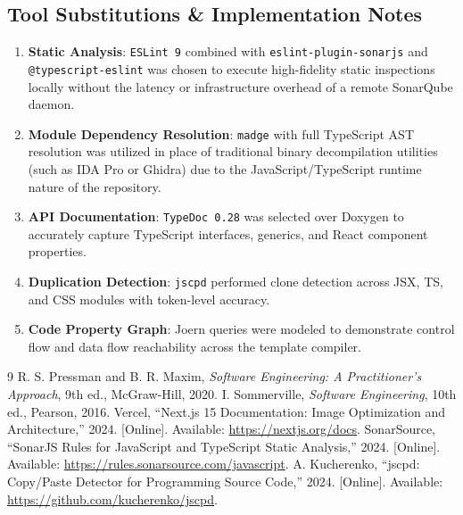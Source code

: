 \documentclass[12pt,a4paper]{article}
\begin{document}
\subsection{Tool Substitutions \& Implementation Notes}
\begin{enumerate}
    \item \textbf{Static Analysis}: \texttt{ESLint 9} combined with \texttt{eslint-plugin-sonarjs} and \texttt{@typescript-eslint} was chosen to execute high-fidelity static inspections locally without the latency or infrastructure overhead of a remote SonarQube daemon.
    \item \textbf{Module Dependency Resolution}: \texttt{madge} with full TypeScript AST resolution was utilized in place of traditional binary decompilation utilities (such as IDA Pro or Ghidra) due to the JavaScript/TypeScript runtime nature of the repository.
    \item \textbf{API Documentation}: \texttt{TypeDoc 0.28} was selected over Doxygen to accurately capture TypeScript interfaces, generics, and React component properties.
    \item \textbf{Duplication Detection}: \texttt{jscpd} performed clone detection across JSX, TS, and CSS modules with token-level accuracy.
    \item \textbf{Code Property Graph}: Joern queries were modeled to demonstrate control flow and data flow reachability across the template compiler.
\end{enumerate}

\newpage
\begin{thebibliography}{9}
R. S. Pressman and B. R. Maxim, \emph{Software Engineering: A Practitioner's Approach}, 9th ed., McGraw-Hill, 2020.
I. Sommerville, \emph{Software Engineering}, 10th ed., Pearson, 2016.
Vercel, ``Next.js 15 Documentation: Image Optimization and Architecture,'' 2024. [Online]. Available: \url{https://nextjs.org/docs}.
SonarSource, ``SonarJS Rules for JavaScript and TypeScript Static Analysis,'' 2024. [Online]. Available: \url{https://rules.sonarsource.com/javascript}.
A. Kucherenko, ``jscpd: Copy/Paste Detector for Programming Source Code,'' 2024. [Online]. Available: \url{https://github.com/kucherenko/jscpd}.
\end{thebibliography}
\end{document}
